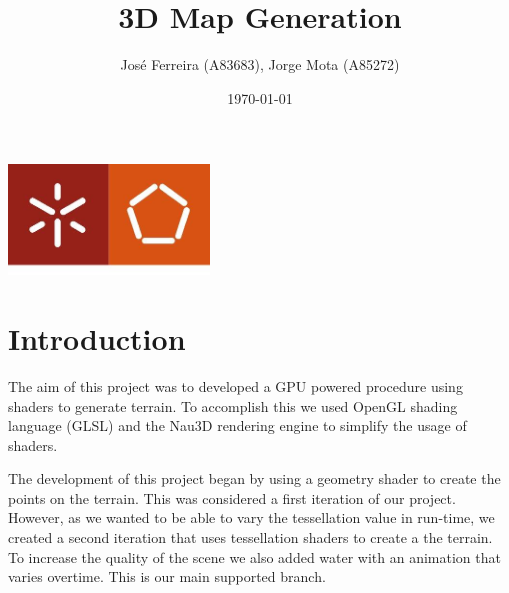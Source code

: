 \documentclass[a4paper]{report}
\begin{document}
\title{3D Map Generation}
\author{José Ferreira (A83683), Jorge Mota (A85272)}
\date{\today}

\begin{center}
    \begin{minipage}{0.75\linewidth}
        \centering
        \includegraphics[width=0.4\textwidth]{images/eng.jpeg}\par\vspace{1cm}
        \vspace{1.5cm}
        \href{https://www.uminho.pt/PT}
        {\color{black}{\scshape\LARGE Universidade do Minho}} \par
        \vspace{1cm}
        \href{https://www.di.uminho.pt/}
        {\color{black}{\scshape\Large Departamento de Informática}} \par
        \vspace{1.5cm}
        \maketitle
    \end{minipage}
\end{center}

\tableofcontents

\pagebreak
\chapter{Introduction}

The aim of this project was to developed a GPU powered procedure using shaders to generate terrain.
To accomplish this we used OpenGL shading language (GLSL) and the Nau3D rendering engine to simplify the usage
of shaders.




The development of this project began by using a geometry shader to create the points on the terrain. This was
considered a first iteration of our project. However, as we wanted to be able to vary the tessellation value
in run-time, we created a second iteration that uses tessellation shaders to create a the terrain. To increase
the quality of the scene we also added water with an animation that varies overtime. This is our main supported
branch.
\end{document}
